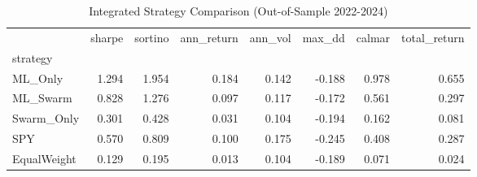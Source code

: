 \begin{table}
\caption{Integrated Strategy Comparison (Out-of-Sample 2022-2024)}
\label{tab:integrated_comparison}
\begin{tabular}{lrrrrrrr}
\toprule
 & sharpe & sortino & ann_return & ann_vol & max_dd & calmar & total_return \\
strategy &  &  &  &  &  &  &  \\
\midrule
ML_Only & 1.294 & 1.954 & 0.184 & 0.142 & -0.188 & 0.978 & 0.655 \\
ML_Swarm & 0.828 & 1.276 & 0.097 & 0.117 & -0.172 & 0.561 & 0.297 \\
Swarm_Only & 0.301 & 0.428 & 0.031 & 0.104 & -0.194 & 0.162 & 0.081 \\
SPY & 0.570 & 0.809 & 0.100 & 0.175 & -0.245 & 0.408 & 0.287 \\
EqualWeight & 0.129 & 0.195 & 0.013 & 0.104 & -0.189 & 0.071 & 0.024 \\
\bottomrule
\end{tabular}
\end{table}
